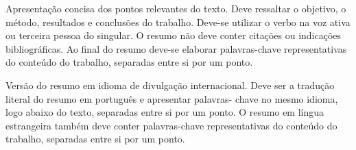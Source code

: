 
\resumo
{
Apresentação concisa dos pontos relevantes do texto. Deve ressaltar o objetivo, o método, resultados e conclusões do trabalho. Deve-se utilizar o verbo na voz ativa ou terceira pessoa do singular. O resumo não deve conter citações ou indicações bibliográficas.
} %
{
Ao final do resumo deve-se elaborar palavras-chave representativas do conteúdo do trabalho, separadas entre si por um ponto.
} %


\abstract
{
Versão do resumo em idioma de divulgação internacional. Deve ser a tradução literal do resumo em português e apresentar palavras- chave no mesmo idioma, logo abaixo do texto, separadas entre si por um ponto.
} %
{
O resumo em língua estrangeira também deve conter palavras-chave representativas do conteúdo do trabalho, separadas entre si por um ponto.
} %


\listafiguras
\listatabelas
{}
\sumario

